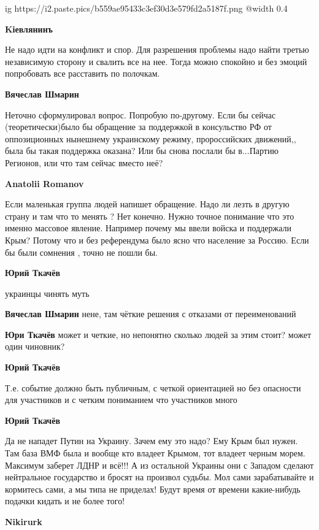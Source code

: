 \begin{itemize}
\ifcmt
  ig https://i2.paste.pics/b559ae95433c3ef30d3e579fd2a5187f.png
  @width 0.4
\fi

\textbf{Kіевлянинъ}

Не надо идти на конфликт и спор. Для разрешения проблемы надо найти третью
независимую сторону и свалить все на нее. Тогда можно спокойно и без эмоций
попробовать все расставить по полочкам.

\textbf{Вячеслав Шмарин}

Неточно сформулировал вопрос.  Попробую по-другому.  Если бы сейчас
(теоретически)было бы обращение за поддержкой в консульство РФ от оппозиционных
нынешнему украинскому режиму, пророссийских движений,, была бы такая поддержка
оказана?  Или бы снова послали бы в...Партию Регионов, или что там сейчас
вместо неё?

\textbf{Anatolii Romanov}

Если маленькая группа людей напишет обращение. Надо ли лезть в другую страну и
там что то менять  ?  Нет конечно. Нужно точное понимание что это именно
массовое явление. Например почему мы ввели войска и поддержали Крым? Потому
что и без референдума было ясно что население за Россию. Если бы были сомнения
, точно не пошли бы.

\textbf{Юрий Ткачёв}

украинцы чинять муть

\textbf{Вячеслав Шмарин}
нене, там чёткие решения с отказами от переименований

\textbf{Юри Ткачёв}
может и четкие, но непонятно сколько людей за этим стоит? может один чиновник?

\textbf{Юрий Ткачёв}

Т.е. событие должно быть публичным, с четкой ориентацией но без опасности для
участников и с четким пониманием что участников много

\textbf{Юрий Ткачёв}

Да не нападет Путин на Украину. Зачем ему это надо? Ему Крым был нужен. Там
база ВМФ была и вообще кто владеет Крымом, тот владеет черным морем. Максимум
заберет ЛДНР и всё!!! А из остальной Украины они с Западом сделают нейтральное
государство и бросят на произвол судьбы. Мол сами зарабатывайте и кормитесь
сами, а мы типа не приделах! Будут время от времени какие-нибудь подачки кидать
и не более того!

\textbf{Nikirurk}


\end{itemize}
